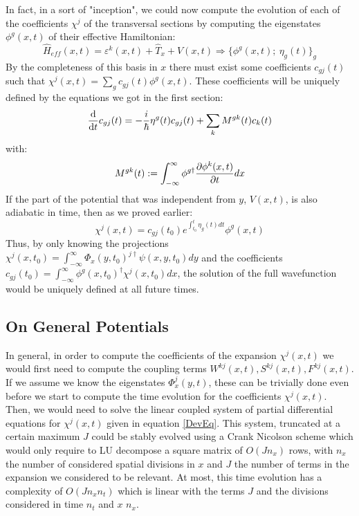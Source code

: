 \documentclass[11pt, a4paper]{article} %
\begin{document}
In fact, in a sort of "inception", we could now compute the evolution of each of the coefficients $\chi^j$ of the transversal sections by computing the eigenstates $\phi^g(x,t)$ of their effective Hamiltonian:
\begin{equation}
\hat{H}_{eff}(x,t)= \varepsilon^k(x,t) + \hat{T}_x+V(x,t) \Rightarrow \{\phi^g(x,t);\ \eta_g(t)\}_g
\end{equation}
By the completeness of this basis in $x$ there must exist some coefficients $c_{gj}(t)$ such that $\chi^j(x,t)=\sum_g c_{gj}(t) \phi^g(x,t)$. These coefficients will be uniquely defined by the equations we got in the first section:
\begin{equation} 
\dv{}{t}c_{gj}(t)=-\frac{i}{\hbar}\eta^g(t) c_{gj}(t) + \sum_k M^{gk}(t)c_k(t)
\end{equation}
with:
\begin{equation}
M^{gk}(t):=\int_{-\infty}^\infty\phi^{g \dagger} \pdv{\phi^k(x,t)}{t} dx
\end{equation}
If the part of the potential that was independent from $y$, $V(x,t)$, is also adiabatic in time, then as we proved earlier:
\begin{equation}
\chi^j(x,t)=c_{gj}(t_0)e^{\int_{t_0}^t \eta_g(t) dt} \phi^g(x,t)
\end{equation}
Thus, by only knowing the projections $\chi^j(x,t_0)=\int_{-\infty}^{\infty}\Phi_x(y,t_0)^{j\dagger} \psi(x,y,t_0)dy$ and the coefficients $c_{gj}(t_0)=\int_{-\infty}^{\infty}\phi^g(x,t_0)^\dagger \chi^j(x,t_0)dx$, the solution of the full wavefunction would be uniquely defined at all future times.

\subsection{On General Potentials}
In general, in order to compute the coefficients of the expansion $\chi^j(x,t)$ we would first need to compute the coupling terms $W^{kj}(x,t),S^{kj}(x,t),F^{kj}(x,t)$. If we assume we know the eigenstates $\Phi^j_x(y,t)$, these can be trivially done even before we start to compute the time evolution for the coefficients $\chi^j(x,t)$. Then, we would need to solve the linear coupled system of partial differential equations for $\chi^j(x,t)$ given in equation \eqref{DevEq}. This system, truncated at a certain maximum $J$ could be stably evolved using a Crank Nicolson scheme which would only require to LU decompose a square matrix of $O(Jn_{x})$ rows, with $n_x$ the number of considered spatial divisions in $x$ and $J$ the number of terms in the expansion we considered to be relevant. At most, this time evolution has a complexity of $O(Jn_xn_t)$ which is linear with the terms $J$ and the divisions considered in time $n_t$ and $x$ $n_x$.
\vspace{+0.1cm}
\end{document}

